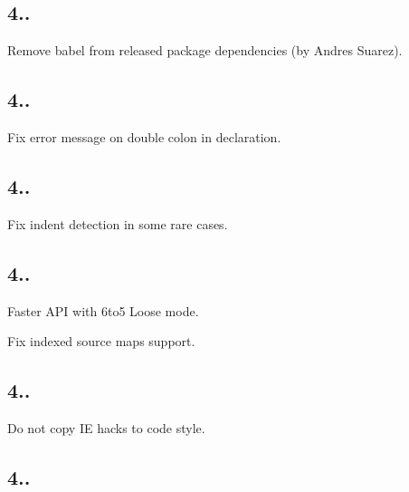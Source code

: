 \subsection*{4..}


\begin{DoxyItemize}
\item Remove {\ttfamily babel} from released package dependencies (by Andres Suarez).
\end{DoxyItemize}

\subsection*{4..}


\begin{DoxyItemize}
\item Fix error message on double colon in declaration.
\end{DoxyItemize}

\subsection*{4..}


\begin{DoxyItemize}
\item Fix indent detection in some rare cases.
\end{DoxyItemize}

\subsection*{4..}


\begin{DoxyItemize}
\item Faster A\+PI with 6to5 Loose mode.
\item Fix indexed source maps support.
\end{DoxyItemize}

\subsection*{4..}


\begin{DoxyItemize}
\item Do not copy IE hacks to code style.
\end{DoxyItemize}

\subsection*{4..}


